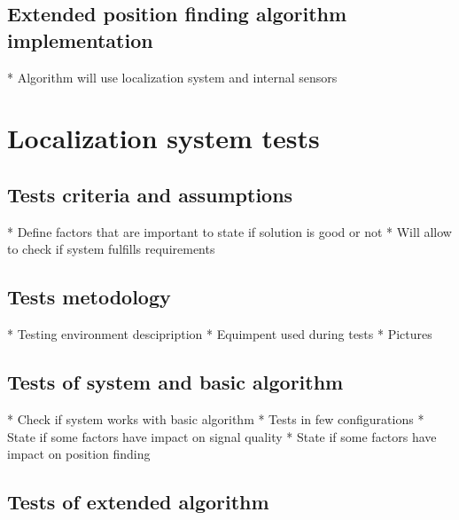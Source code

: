 \documentclass[../main.tex]{subfiles}
\begin{document}

\section{Extended position finding algorithm implementation} %
\label{sec:extended_position_finding_algorithm_implementation}

* Algorithm will use localization system and internal sensors


\chapter{Localization system tests}

\section{Tests criteria and assumptions} %
\label{sec:tests_criteria_and_assumptions}

* Define factors that are important to state if solution is good or not
* Will allow to check if system fulfills requirements


\section{Tests metodology} %
\label{sec:tests_metodology}

* Testing environment descipription
* Equimpent used during tests
* Pictures


\section{Tests of system and basic algorithm} %
\label{sec:tests_of_system_and_basic_algorithm}

* Check if system works with basic algorithm
* Tests in few configurations
* State if some factors have impact on signal quality
* State if some factors have impact on position finding

\section{Tests of extended algorithm} %
\label{sec:tests_of_extended_algorithm}
\end{document}
